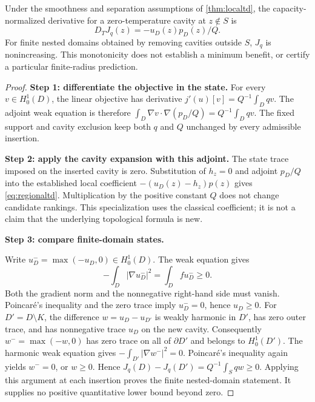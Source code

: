 \begin{proposition}
Under the smoothness and separation assumptions of
\cref{thm:localtd}, the capacity-normalized derivative for a
zero-temperature cavity at $z\notin S$ is
\begin{equation}
 D_TJ_q(z)=-u_D(z)p_D(z)/Q.
 \label{eq:regionaltd}
\end{equation}
For finite nested domains obtained by removing cavities outside $S$,
$J_q$ is nonincreasing. This monotonicity does not establish a minimum
benefit, or certify a particular finite-radius prediction.
\end{proposition}
\begin{proof}
\textbf{Step 1: differentiate the objective in the state.}
For every $v\in H^1_0(D)$, the linear objective has derivative
$j'(u)[v]=Q^{-1}\int_D qv$. The adjoint weak equation is therefore
$\int_D\nabla v\cdot\nabla(p_D/Q)=Q^{-1}\int_D qv$.
The fixed support and cavity exclusion keep both $q$ and $Q$ unchanged
by every admissible insertion.

\textbf{Step 2: apply the cavity expansion with this adjoint.}
The state trace imposed on the inserted cavity is zero. Substitution
of $h_z=0$ and adjoint $p_D/Q$ into the established local coefficient
$-(u_D(z)-h_z)p(z)$ gives \cref{eq:regionaltd}. Multiplication by
the positive constant $Q$ does not change candidate rankings. This
specialization uses the classical coefficient; it is not a claim that
the underlying topological formula is new.

\textbf{Step 3: compare finite-domain states.}\par
Write $u_D^-=\max(-u_D,0)\in H^1_0(D)$. The weak equation gives
\[
 -\int_D|\nabla u_D^-|^2=\int_D f u_D^-\geq0.
\]
Both the gradient norm and the nonnegative right-hand side must vanish.
Poincar\'e's inequality and the zero trace imply $u_D^-=0$, hence
$u_D\geq0$. For $D'=D\setminus K$, the difference
$w=u_D-u_{D'}$ is weakly harmonic in $D'$, has zero outer trace, and
has nonnegative trace $u_D$ on the new cavity. Consequently
$w^-=\max(-w,0)$ has zero trace on all of $\partial D'$ and belongs
to $H^1_0(D')$. The harmonic weak equation gives
$-\int_{D'}|\nabla w^-|^2=0$. Poincar\'e's inequality again yields
$w^-=0$, or $w\geq0$. Hence
$J_q(D)-J_q(D')=Q^{-1}\int_S qw\geq0$. Applying this argument at
each insertion proves the finite nested-domain statement. It supplies
no positive quantitative lower bound beyond zero.
\end{proof}

